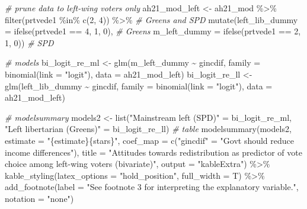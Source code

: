 \documentclass[
]{article}
\newenvironment{Shaded}{\begin{snugshade}}{\end{snugshade}}
\newcommand{\AttributeTok}[1]{\textcolor[rgb]{0.77,0.63,0.00}{#1}}
\newcommand{\CommentTok}[1]{\textcolor[rgb]{0.56,0.35,0.01}{\textit{#1}}}
\newcommand{\DecValTok}[1]{\textcolor[rgb]{0.00,0.00,0.81}{#1}}
\newcommand{\FunctionTok}[1]{\textcolor[rgb]{0.00,0.00,0.00}{#1}}
\newcommand{\NormalTok}[1]{#1}
\newcommand{\OtherTok}[1]{\textcolor[rgb]{0.56,0.35,0.01}{#1}}
\newcommand{\SpecialCharTok}[1]{\textcolor[rgb]{0.00,0.00,0.00}{#1}}
\newcommand{\StringTok}[1]{\textcolor[rgb]{0.31,0.60,0.02}{#1}}
\begin{document}
\begin{Shaded}
\begin{Highlighting}[]
\CommentTok{\# prune data to left{-}wing voters only}
\NormalTok{ah21\_mod\_left }\OtherTok{\textless{}{-}}\NormalTok{ ah21\_mod }\SpecialCharTok{\%\textgreater{}\%}
  \FunctionTok{filter}\NormalTok{(prtvede1 }\SpecialCharTok{\%in\%} \FunctionTok{c}\NormalTok{(}\DecValTok{2}\NormalTok{, }\DecValTok{4}\NormalTok{)) }\SpecialCharTok{\%\textgreater{}\%} \CommentTok{\# Greens and SPD }
  \FunctionTok{mutate}\NormalTok{(}\AttributeTok{left\_lib\_dummy =} \FunctionTok{ifelse}\NormalTok{(prtvede1 }\SpecialCharTok{==} \DecValTok{4}\NormalTok{, }\DecValTok{1}\NormalTok{, }\DecValTok{0}\NormalTok{), }\CommentTok{\# Greens}
         \AttributeTok{m\_left\_dummy =} \FunctionTok{ifelse}\NormalTok{(prtvede1 }\SpecialCharTok{==} \DecValTok{2}\NormalTok{, }\DecValTok{1}\NormalTok{, }\DecValTok{0}\NormalTok{)) }\CommentTok{\# SPD}

\CommentTok{\# models }
\NormalTok{bi\_logit\_re\_ml }\OtherTok{\textless{}{-}} \FunctionTok{glm}\NormalTok{(m\_left\_dummy }\SpecialCharTok{\textasciitilde{}}\NormalTok{ gincdif, }
                      \AttributeTok{family =} \FunctionTok{binomial}\NormalTok{(}\AttributeTok{link =} \StringTok{"logit"}\NormalTok{), }
                      \AttributeTok{data =}\NormalTok{ ah21\_mod\_left)}
\NormalTok{bi\_logit\_re\_ll }\OtherTok{\textless{}{-}} \FunctionTok{glm}\NormalTok{(left\_lib\_dummy }\SpecialCharTok{\textasciitilde{}}\NormalTok{ gincdif, }
                      \AttributeTok{family =} \FunctionTok{binomial}\NormalTok{(}\AttributeTok{link =} \StringTok{"logit"}\NormalTok{), }
                      \AttributeTok{data =}\NormalTok{ ah21\_mod\_left)}

\CommentTok{\# modelsummary}
\NormalTok{models2 }\OtherTok{\textless{}{-}} \FunctionTok{list}\NormalTok{(}\StringTok{"Mainstream left (SPD)"} \OtherTok{=}\NormalTok{ bi\_logit\_re\_ml, }
                \StringTok{"Left libertarian (Greens)"} \OtherTok{=}\NormalTok{ bi\_logit\_re\_ll)}
\CommentTok{\# table }
\FunctionTok{modelsummary}\NormalTok{(models2, }
             \AttributeTok{estimate =} \StringTok{"\{estimate\}\{stars\}"}\NormalTok{,}
             \AttributeTok{coef\_map =} \FunctionTok{c}\NormalTok{(}\StringTok{"gincdif"} \OtherTok{=} \StringTok{"Gov\textquotesingle{}t should reduce income differences"}\NormalTok{), }
             \AttributeTok{title =} \StringTok{"Attitudes towards redistribution as predictor of vote choice among left{-}wing voters (bivariate)"}\NormalTok{, }
             \AttributeTok{output =} \StringTok{"kableExtra"}\NormalTok{) }\SpecialCharTok{\%\textgreater{}\%}
  \FunctionTok{kable\_styling}\NormalTok{(}\AttributeTok{latex\_options =} \StringTok{"hold\_position"}\NormalTok{, }\AttributeTok{full\_width =}\NormalTok{ T) }\SpecialCharTok{\%\textgreater{}\%}
  \FunctionTok{add\_footnote}\NormalTok{(}\AttributeTok{label =} \StringTok{"See footnote 3 for interpreting the explanatory variable."}\NormalTok{, }
               \AttributeTok{notation =} \StringTok{"none"}\NormalTok{)}
\end{Highlighting}
\end{Shaded}
\end{document}
